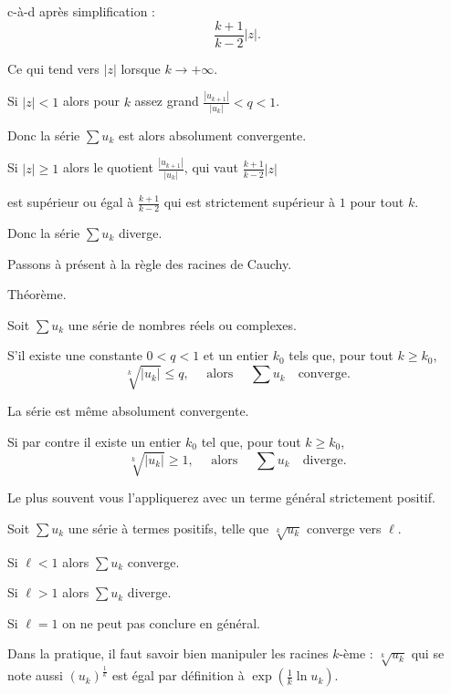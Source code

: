 \change
c-à-d après simplification :
$$
\frac{k+1}{k-2}|z|.$$

\change
Ce qui tend vers $ |z| $ lorsque $k\to+\infty.$

\change
Si $|z|<1$ alors pour $k$ assez grand $\frac{|u_{k+1}|}{|u_k|} < q <1$.

\change
Donc la série $\sum u_k$ est alors absolument convergente.

\change
Si $|z|\ge 1$ alors le quotient $\frac{|u_{k+1}|}{|u_k|}$, qui vaut $\frac{k+1}{k-2}|z|$

\change
est supérieur ou égal à $\frac{k+1}{k-2}$ qui est strictement supérieur à $ 1$ pour tout $k$. 

\change
Donc la série $\sum u_k$  diverge.


\diapo

Passons à présent à la règle des racines de Cauchy.

\change
Théorème.

Soit $\sum u_k$ une série de nombres réels ou complexes.

\change
S'il existe une constante $0<q<1$ et un entier $k_0$ tels que, pour tout
$k \ge k_0$,  
$$
\sqrt[k]{|u_k|} \le q ,\quad \text{ alors }\quad\sum u_k\quad \text{converge.}
$$

\change
La série est même absolument convergente.

\change
Si par contre il existe un entier $k_0$ tel que, pour tout $k \ge k_0$, 
$$
\sqrt[k]{|u_k|} \ge 1,\quad \text{ alors }\quad\sum u_k \quad\text{diverge.}
$$


\diapo

Le plus souvent vous l'appliquerez avec un terme général strictement positif.

\change
Soit $\sum u_k$ une série à termes positifs, telle que 
$\sqrt[k]{u_k}$ converge vers $\ell$.

\change
Si $\ell<1$ alors $\sum u_k$ converge.

\change
Si $\ell>1$ alors $\sum u_k$ diverge.

\change
Si $\ell=1$ on ne peut pas conclure en général.

\change
Dans la pratique, il faut savoir bien manipuler les racines $k$-ème : 
$\sqrt[k]{u_k} $ qui se note aussi $ (u_k)^{\frac1k}$ est égal par définition à $\exp\left(\tfrac1k \ln u_k\right)$.


\diapo

